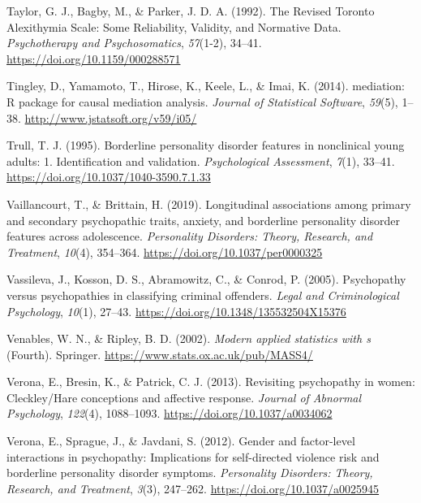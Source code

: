 \documentclass[
  man,floatsintext]{apa7}
\newlength{\cslhangindent}
\newlength{\cslentryspacingunit} %
\newenvironment{CSLReferences}[2] %
 {%
  \setlength{\parindent}{0pt}
  \ifodd #1
  \let\oldpar\par
  \def\par{\hangindent=\cslhangindent\oldpar}
  \fi
  \setlength{\parskip}{#2\cslentryspacingunit}
 }%
 {}
\begin{document}
\begin{CSLReferences}{1}{0}
\leavevmode{}%
Taylor, G. J., Bagby, M., \& Parker, J. D. A. (1992). The {Revised Toronto Alexithymia Scale}: {Some Reliability}, {Validity}, and {Normative Data}. \emph{Psychotherapy and Psychosomatics}, \emph{57}(1-2), 34--41. \url{https://doi.org/10.1159/000288571}

\leavevmode{}%
Tingley, D., Yamamoto, T., Hirose, K., Keele, L., \& Imai, K. (2014). {mediation}: {R} package for causal mediation analysis. \emph{Journal of Statistical Software}, \emph{59}(5), 1--38. \url{http://www.jstatsoft.org/v59/i05/}

\leavevmode{}%
Trull, T. J. (1995). Borderline personality disorder features in nonclinical young adults: 1. {Identification} and validation. \emph{Psychological Assessment}, \emph{7}(1), 33--41. \url{https://doi.org/10.1037/1040-3590.7.1.33}

\leavevmode{}%
Vaillancourt, T., \& Brittain, H. (2019). Longitudinal associations among primary and secondary psychopathic traits, anxiety, and borderline personality disorder features across adolescence. \emph{Personality Disorders: Theory, Research, and Treatment}, \emph{10}(4), 354--364. \url{https://doi.org/10.1037/per0000325}

\leavevmode{}%
Vassileva, J., Kosson, D. S., Abramowitz, C., \& Conrod, P. (2005). Psychopathy versus psychopathies in classifying criminal offenders. \emph{Legal and Criminological Psychology}, \emph{10}(1), 27--43. \url{https://doi.org/10.1348/135532504X15376}

\leavevmode{}%
Venables, W. N., \& Ripley, B. D. (2002). \emph{Modern applied statistics with s} (Fourth). Springer. \url{https://www.stats.ox.ac.uk/pub/MASS4/}

\leavevmode{}%
Verona, E., Bresin, K., \& Patrick, C. J. (2013). Revisiting psychopathy in women: {Cleckley}/{Hare} conceptions and affective response. \emph{Journal of Abnormal Psychology}, \emph{122}(4), 1088--1093. \url{https://doi.org/10.1037/a0034062}

\leavevmode{}%
Verona, E., Sprague, J., \& Javdani, S. (2012). Gender and factor-level interactions in psychopathy: {Implications} for self-directed violence risk and borderline personality disorder symptoms. \emph{Personality Disorders: Theory, Research, and Treatment}, \emph{3}(3), 247--262. \url{https://doi.org/10.1037/a0025945}


\end{CSLReferences}
\end{document}
